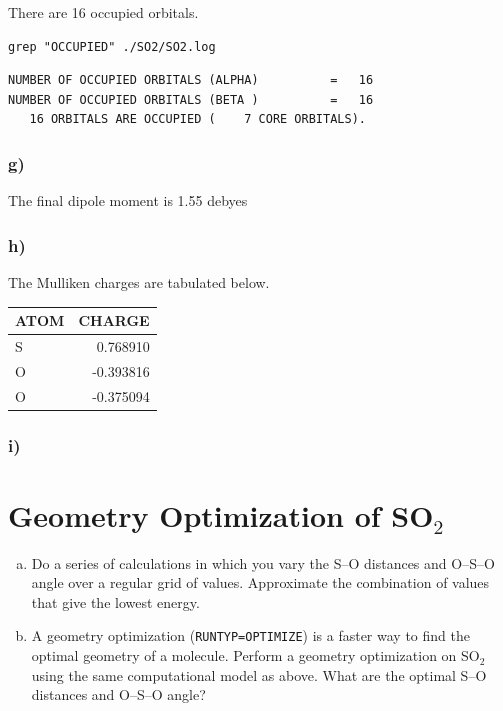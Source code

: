 \documentclass[11pt]{article}
\begin{document}
There are 16 occupied orbitals.

\begin{verbatim}
grep "OCCUPIED" ./SO2/SO2.log
\end{verbatim}

\begin{verbatim}
NUMBER OF OCCUPIED ORBITALS (ALPHA)          =   16
NUMBER OF OCCUPIED ORBITALS (BETA )          =   16
   16 ORBITALS ARE OCCUPIED (    7 CORE ORBITALS).
\end{verbatim}




\subsubsection{g)}
\label{sec-2-1-7}

The final dipole moment is 1.55 debyes

\subsubsection{h)}
\label{sec-2-1-8}

The Mulliken charges are tabulated below.

\begin{center}
\begin{tabular}{lr}
ATOM & CHARGE\\
\hline
S & 0.768910\\
O & -0.393816\\
O & -0.375094\\
\end{tabular}
\end{center}


\subsubsection{i)}
\label{sec-2-1-9}

\section{Geometry Optimization of SO$_{\text{2}}$}
\label{sec-3}

\begin{enumerate}[(a)]
\item Do a series of calculations in which you vary the S–O distances and O–S–O angle over a regular grid of values. Approximate the combination of values that give the lowest energy.

\item A geometry optimization (\verb~RUNTYP=OPTIMIZE~) is a faster way to find the optimal geometry of a molecule. Perform a geometry optimization on SO$_{\text{2}}$ using the same computational model as above. What are the optimal S–O distances and O–S–O angle?
\end{enumerate}
\end{document}
